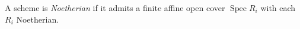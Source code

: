 
A scheme is \emph{Noetherian} if it admits a finite affine open cover $\operatorname{Spec}R_i$ with each $R_i$ Noetherian.

